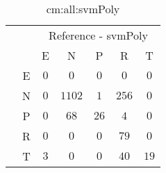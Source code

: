 \begin{table}[!ht]
	\centering
	\begin{tabular}{|c|c|c|c|c|c|c|}
		\cline{3-7}
		\multicolumn{2}{c|}{} & \multicolumn{5}{|c|}{Reference - svmPoly} \\ \cline{3-7}
		\multicolumn{2}{c|}{} & E & N & P & R & T \\ \hline
		\multirow{5}{*}{\rotatebox{90}{Prediction}} & E & $0$ & $0$ & $0$ & $0$ & $0$ \\ \cline{2-7}
		 & N & $0$ & $1102$ & $1$ & $256$ & $0$ \\ \cline{2-7}
		 & P & $0$ & $68$ & $26$ & $4$ & $0$ \\ \cline{2-7}
		 & R & $0$ & $0$ & $0$ & $79$ & $0$ \\ \cline{2-7}
		 & T & $3$ & $0$ & $0$ & $40$ & $19$ \\ \hline
	\end{tabular}
	\caption{cm:all:svmPoly}
	\label{tab:cm:all:svmPoly}
\end{table}
